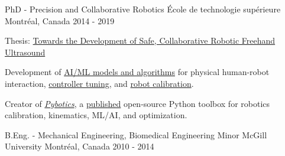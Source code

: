 \begin{cventries}

    \cventry
    {PhD - Precision and Collaborative Robotics}
    {École de technologie supérieure}
    {Montréal, Canada}
    {2014 - 2019}
    {
        \begin{cvitems}
            \item{Thesis: \href{https://www.nicholasnadeau.com/publication/nadeau-2019-towards/}{Towards the Development of Safe, Collaborative Robotic Freehand Ultrasound}}
            \item{Development of \href{https://www.nicholasnadeau.com/talk/hardware-in-the-loop-training-robot-contact-in-an-unstructured-environment/}{AI/ML models and algorithms} for physical human-robot interaction, \href{https://www.nicholasnadeau.com/publication/nadeau-2018-evolutionary/}{controller tuning}, and \href{https://www.nicholasnadeau.com/publication/nadeau-2019-impedance/}{robot calibration}.}
            \item{Creator of \href{https://github.com/nnadeau/pybotics}{\textit{Pybotics}}, a \href{https://joss.theoj.org/papers/10.21105/joss.01738}{published} open-source Python toolbox for robotics calibration, kinematics, ML/AI, and optimization.}
        \end{cvitems}
    }

    \cventry
    {B.Eng. - Mechanical Engineering, Biomedical Engineering Minor}
    {McGill University}
    {Montréal, Canada}
    {2010 - 2014}
    {
        \begin{cvitems}
        \end{cvitems}
    }

\end{cventries}
